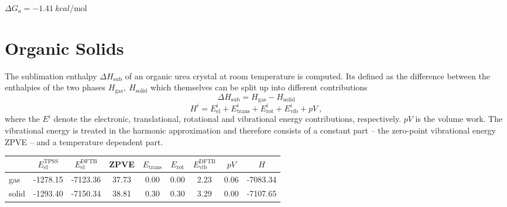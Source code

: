 \documentclass[a4paper,12pt]{scrartcl}
\begin{document}
$ \Delta G_a = \SI[]{-1.41}{kcal\per\mole} $
%
\section{Organic Solids}
%
The sublimation enthalpy $ \Delta H_\mathrm{sub} $ of an organic urea crystal at room temperature is computed. Its defined as the difference between the enthalpies of the two phases $ H_\mathrm{gas},~H_\mathrm{solid} $ which themselves can be split up into different contributions
%
\begin{equation}
	\Delta H_\mathrm{sub} = H_\mathrm{gas} - H_\mathrm{solid}
\end{equation}
%
\begin{equation}
	H^i = E_\mathrm{el}^i + E_\mathrm{trans}^i + E_\mathrm{rot}^i + E_\mathrm{vib}^i + pV~,
\end{equation}
%
where the $ E^i $ denote the electronic, translational, rotational and vibrational energy contributions, respectively. $ pV $ is the volume work. The vibrational energy is treated in the harmonic approximation and therefore consists of a constant part -- the zero-point vibrational energy ZPVE -- and a temperature dependent part.
%
\begin{table}[H]
	\centering
	\label{tab:sublimation}
	\begin{tabular}{l|cccccccc}
		\toprule
		& $ E_\mathrm{el}^\mathrm{TPSS} $ & $ E_\mathrm{el}^\mathrm{DFTB} $ & ZPVE & $ E_\mathrm{trans} $ & $ E_\mathrm{rot} $ & $ E_\mathrm{vib}^\mathrm{DFTB} $ & $ pV $ & $ H $ \\
		\midrule
		gas   & -1278.15 & -7123.36 & 37.73 & 0.00 & 0.00 & 2.23 & 0.06 & -7083.34 \\
		solid & -1293.40 & -7150.34 & 38.81 & 0.30 & 0.30 & 3.29 & 0.00 & -7107.65 \\
		\bottomrule
	\end{tabular}
\end{table}
%
\newpage
\printbibliography[title={Literature}]
%
\end{document}

